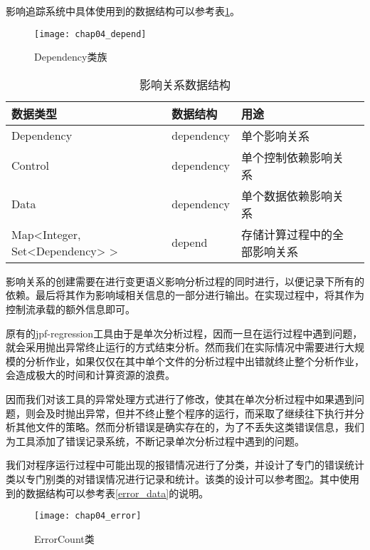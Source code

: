 影响追踪系统中具体使用到的数据结构可以参考表\ref {track_data}。

\begin{figure}[H]
	\centering
	\texttt{[image: chap04\_depend]}
	\caption {Dependency类族}
	\label {class_depend}	
\end{figure}

\begin{table}
	\caption{影响关系数据结构}
	\label{track_data}
	\centering
	\begin{tabular}{lllc}
		\toprule[1.5pt]
		{\heiti 数据类型} &{\heiti 数据结构} & {\heiti 用途} \\\midrule[1pt]
		Dependency & dependency & 单个影响关系 \\
		Control & dependency & 单个控制依赖影响关系 \\
		Data & dependency & 单个数据依赖影响关系 \\
		Map<Integer, Set<Dependency> > & depend & 存储计算过程中的全部影响关系\\
		\bottomrule[1.5pt]
	\end{tabular}
\end{table}

影响关系的创建需要在进行变更语义影响分析过程的同时进行，以便记录下所有的依赖。最后将其作为影响域相关信息的一部分进行输出。在实现过程中，将其作为控制流承载的额外信息即可。

原有的jpf-regression工具由于是单次分析过程，因而一旦在运行过程中遇到问题，就会采用抛出异常终止运行的方式结束分析。然而我们在实际情况中需要进行大规模的分析作业，如果仅仅在其中单个文件的分析过程中出错就终止整个分析作业，会造成极大的时间和计算资源的浪费。

因而我们对该工具的异常处理方式进行了修改，使其在单次分析过程中如果遇到问题，则会及时抛出异常，但并不终止整个程序的运行，而采取了继续往下执行并分析其他文件的策略。然而分析错误是确实存在的，为了不丢失这类错误信息，我们为工具添加了错误记录系统，不断记录单次分析过程中遇到的问题。

我们对程序运行过程中可能出现的报错情况进行了分类，并设计了专门的错误统计类以专门别类的对错误情况进行记录和统计。该类的设计可以参考图\ref {class_error}。其中使用到的数据结构可以参考表\ref {error_data}的说明。

\begin{figure}[H]
	\centering
	\texttt{[image: chap04\_error]}
	\caption {ErrorCount类}
	\label {class_error}	
\end{figure}

